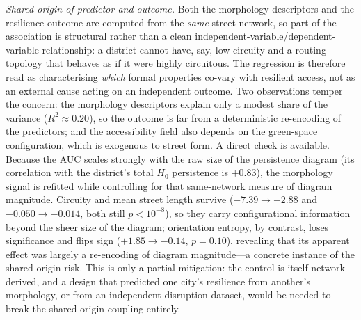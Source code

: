 \emph{Shared origin of predictor and outcome.} Both the morphology descriptors and
the resilience outcome are computed from the \emph{same} street network, so part of
the association is structural rather than a clean independent-variable/dependent-
variable relationship: a district cannot have, say, low circuity and a routing
topology that behaves as if it were highly circuitous. The
regression is therefore read as characterising \emph{which} formal properties co-vary with resilient
access, not as an external cause acting on an independent outcome. Two observations
temper the concern: the morphology descriptors explain only a modest share of the
variance ($R^2\approx0.20$), so the outcome is far from a
deterministic re-encoding of the predictors; and the accessibility field also
depends on the green-space configuration, which is exogenous to street form. A direct
check is available. Because the AUC scales strongly with the raw size of the
persistence diagram (its correlation with the district's total $H_0$ persistence is
$+0.83$), the morphology signal is refitted while controlling for that
same-network measure of diagram magnitude. Circuity and mean street length survive
($-7.39\to-2.88$ and $-0.050\to-0.014$, both still $p<10^{-8}$), so they carry
configurational information beyond the sheer size of the diagram; orientation entropy,
by contrast, loses significance and flips sign ($+1.85\to-0.14$, $p=0.10$), revealing
that its apparent effect was largely a re-encoding of diagram magnitude---a concrete
instance of the shared-origin risk. This is only a partial mitigation: the control is
itself network-derived, and a design that predicted one city's resilience from
another's morphology, or from an independent disruption dataset, would be
needed to break the shared-origin coupling entirely.

